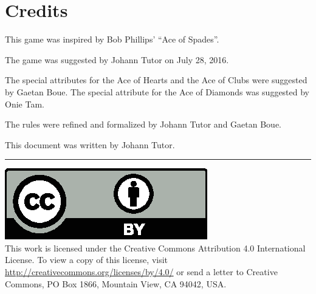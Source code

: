 \documentclass{article}
\begin{document}
\newpage
\section{Credits}

This game was inspired by Bob Phillips' ``Ace of Spades''.

The game was suggested by Johann Tutor on July 28, 2016.

The special attributes for the Ace of Hearts and the Ace of Clubs were
suggested by Gaetan Boue. The special attribute for the Ace of Diamonds
was suggested by Onie Tam.

The rules were refined and formalized by Johann Tutor and Gaetan Boue.

This document was written by Johann Tutor.

\medskip
\hrule

{
  \small
  \includegraphics[scale=0.5]{cc-by.eps}\\
  This work is licensed under the Creative Commons Attribution 4.0
  International License. To view a copy of this license, visit
  \url{http://creativecommons.org/licenses/by/4.0/} or send a letter to Creative Commons, PO Box 1866, Mountain View, CA 94042, USA.
}
\end{document}
